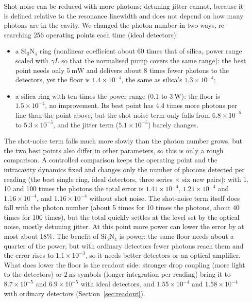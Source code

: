 Shot noise can be reduced with more photons; detuning jitter cannot, because it is defined relative to the resonance linewidth and
does not depend on how many photons are in the cavity. We changed the photon number in two ways, re-searching 256 operating points
each time (ideal detectors):
\begin{itemize}
\item a Si$_3$N$_4$ ring (nonlinear coefficient about 60 times that of silica, power range scaled with $\gamma L$ so that the
      normalised pump covers the same range): the best point needs only $5~\mathrm{mW}$ and delivers about 8 times fewer photons to
      the detectors, yet the floor is $1.4\times10^{-4}$, the same as silica's $1.3\times10^{-4}$;
\item a silica ring with ten times the power range ($0.1$ to $3~\mathrm{W}$): the floor is $1.5\times10^{-4}$, no improvement. Its best
      point has 4.4 times more photons per line than the point above, but the shot-noise term only falls from $6.8\times10^{-5}$ to
      $5.3\times10^{-5}$, and the jitter term ($5.1\times10^{-5}$) barely changes.
\end{itemize}
The shot-noise term falls much more slowly than the photon number grows, but the two best points also differ in other parameters,
so this is only a rough comparison. A controlled comparison keeps the operating point and the intracavity dynamics fixed and changes
only the number of photons detected per reading (the best single ring, ideal detectors, three series $\times$ six new pairs): with
1, 10 and 100 times the photons the total error is $1.41\times10^{-4}$, $1.21\times10^{-4}$ and $1.16\times10^{-4}$, and
$1.16\times10^{-4}$ without shot noise. The shot-noise term itself does fall with the photon number (about 5 times for 10 times the
photons, about 40 times for 100 times), but the total quickly settles at the level set by the optical noise, mostly detuning jitter.
At this point more power can lower the error by at most about 18\%.
The benefit of Si$_3$N$_4$ is power: the same floor needs about a quarter of the power; but with ordinary detectors fewer photons
reach them and the error rises to $1.1\times10^{-3}$, so it needs better detectors or an optical amplifier.
What does lower the floor is the readout side: stronger drop coupling (more light to the detectors) or $2~\mathrm{ns}$ symbols (longer
integration per reading) bring it to $8.7\times10^{-5}$ and $6.9\times10^{-5}$ with ideal detectors, and $1.55\times10^{-4}$ and
$1.58\times10^{-4}$ with ordinary detectors (Section~\ref{sec:readout}).


